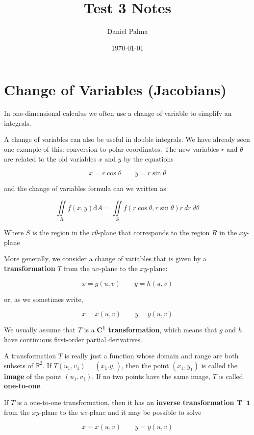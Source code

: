 \documentclass{article}
\author{Daniel Palma}
\date{\today}
\title{Test 3 Notes}
\begin{document}
\maketitle
\newpage

\tableofcontents
\newpage

\section{Change of Variables (Jacobians)}

In one-dimensional calculus we often use a change of variable to simplify an integrals.

A change of variables can also be useful in double integrals. We have already seen one example of this: conversion to polar coordinates. The new variables $r$ and $\theta$ are related to the old variables $x$ and $y$ by the equations 

$$ x = r \cos{\theta} \qquad y = r \sin{\theta} $$

and the change of variables formula can we written as 

$$\iint\limits_{R} f(x,y) \mathrm{d}A = \iint\limits_{S} f(r\cos{\theta}, r\sin{\theta})r \ dr \ d\theta$$

Where $S$ is the region in the $r\theta$-plane that corresponds to the region $R$ in the $xy$-plane

More generally, we consider a change of variables that is given by a \textbf{transformation} $T$ from the $uv$-plane to the $xy$-plane:

$$x = g(u,v) \qquad y = h(u,v)$$

or, as we sometimes write,

$$x = x(u,v) \qquad y = y(u,v)$$

We usually assume that $T$ is a \textbf{$\mathbf{C^1}$ transformation}, which means that $g$ and $h$ have continuous first-order partial derivatives.

A transformation $T$ is really just a function whose domain and range are both subsets of $\mathbb{R}^2$. If $T(u_1, v_1) = (x_1.y_1)$, then the point $(x_1,y_1)$ is called the \textbf{image} of the point $(u_1, v_1)$. If no two points have the same image, $T$ is called \textbf{one-to-one}. 

If $T$ is a one-to-one transformation, then it has an \textbf{inverse transformation $\mathbf{T^-1}$} from the $xy$-plane to the $uv$-plane and it may be possible to solve 

$$x = x(u,v) \qquad y = y(u,v)$$
\end{document}
